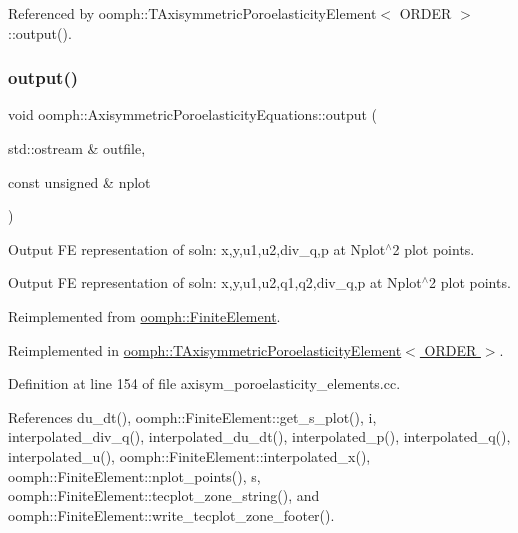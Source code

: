 Referenced by oomph\+::\+T\+Axisymmetric\+Poroelasticity\+Element$<$ O\+R\+D\+E\+R $>$\+::output().

\mbox{\label{classoomph_1_1AxisymmetricPoroelasticityEquations_af5dcc8768f5323427ebaf17cad67a64a}} 
\subsubsection{\texorpdfstring{output()}{output()}\hspace{0.1cm}{\footnotesize\ttfamily [2/2]}}
{\footnotesize\ttfamily void oomph\+::\+Axisymmetric\+Poroelasticity\+Equations\+::output (\begin{DoxyParamCaption}\item[{std\+::ostream \&}]{outfile,  }\item[{const unsigned \&}]{nplot }\end{DoxyParamCaption})\hspace{0.3cm}{\ttfamily [virtual]}}



Output FE representation of soln\+: x,y,u1,u2,div\+\_\+q,p at Nplot$^\wedge$2 plot points. 

Output FE representation of soln\+: x,y,u1,u2,q1,q2,div\+\_\+q,p at Nplot$^\wedge$2 plot points. 

Reimplemented from \hyperlink{classoomph_1_1FiniteElement_afa9d9b2670f999b43e6679c9dd28c457}{oomph\+::\+Finite\+Element}.



Reimplemented in \hyperlink{classoomph_1_1TAxisymmetricPoroelasticityElement_a8a9f71d4757ccb3c1a172f080e2731ca}{oomph\+::\+T\+Axisymmetric\+Poroelasticity\+Element$<$ O\+R\+D\+E\+R $>$}.



Definition at line 154 of file axisym\+\_\+poroelasticity\+\_\+elements.\+cc.



References du\+\_\+dt(), oomph\+::\+Finite\+Element\+::get\+\_\+s\+\_\+plot(), i, interpolated\+\_\+div\+\_\+q(), interpolated\+\_\+du\+\_\+dt(), interpolated\+\_\+p(), interpolated\+\_\+q(), interpolated\+\_\+u(), oomph\+::\+Finite\+Element\+::interpolated\+\_\+x(), oomph\+::\+Finite\+Element\+::nplot\+\_\+points(), s, oomph\+::\+Finite\+Element\+::tecplot\+\_\+zone\+\_\+string(), and oomph\+::\+Finite\+Element\+::write\+\_\+tecplot\+\_\+zone\+\_\+footer().

